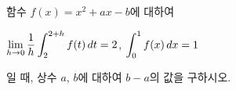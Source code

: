 함수 $f(x)=x^2+ax-b$에 대하여 \par\smallskip\noindent\hspace*{1.5em}$\displaystyle\lim_{h\to 0} \dfrac{1}{h}\int_{2}^{2+h} f(t)\mkern3mu dt=2$, $\displaystyle\int_{0}^{1} f(x)\mkern3mu dx=1$\par\smallskip\noindent 일 때, 상수 $a$, $b$에 대하여 $b-a$의 값을 구하시오.
